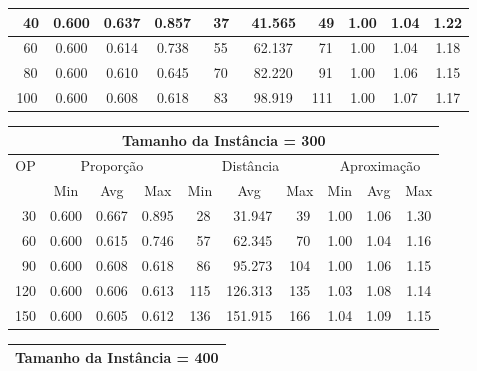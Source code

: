 \begin{table}[htbp]
\begin{center}
{\begin{tabular}{|c|c|c|c|c|c|c|c|c|c|}
~40                 & 0.600     & 0.637    & 0.857    & ~37      & ~41.565  & ~49     & 1.00    & 1.04   & 1.22            \\ \hline
~60                 & 0.600     & 0.614    & 0.738    & ~55      & ~62.137  & ~71     & 1.00    & 1.04   & 1.18            \\ \hline
~80                 & 0.600     & 0.610    & 0.645    & ~70      & ~82.220  & ~91     & 1.00    & 1.06   & 1.15            \\ \hline
100                 & 0.600     & 0.608    & 0.618    & ~83      & ~98.919  & 111     & 1.00    & 1.07   & 1.17            \\ \hline
\end{tabular}%
\vspace{5pt}
\begin{tabular}{|c|c|c|c|c|c|c|c|c|c|}
\hline
\multicolumn{10}{|c|}{\bf Tamanho da Instância = 300}                                                                          \\ \hline
\multirow{2}{*}{OP} & \multicolumn{3}{c|}{Proporção} & \multicolumn{3}{c|}{Distância} & \multicolumn{3}{c|}{Aproximação}   \\ \cline{2-10}
                    & Min       & Avg      & Max      & Min      & Avg      & Max     & Min     & Avg    & Max             \\ \hline
~30                 & 0.600     & 0.667    & 0.895    & ~28      & ~31.947  & ~39     & 1.00    & 1.06   & 1.30            \\ \hline
~60                 & 0.600     & 0.615    & 0.746    & ~57      & ~62.345  & ~70     & 1.00    & 1.04   & 1.16            \\ \hline
~90                 & 0.600     & 0.608    & 0.618    & ~86      & ~95.273  & 104     & 1.00    & 1.06   & 1.15            \\ \hline
120                 & 0.600     & 0.606    & 0.613    & 115      & 126.313  & 135     & 1.03    & 1.08   & 1.14            \\ \hline
150                 & 0.600     & 0.605    & 0.612    & 136      & 151.915  & 166     & 1.04    & 1.09   & 1.15            \\ \hline
\end{tabular}%
\vspace{5pt}
\begin{tabular}{|c|c|c|c|c|c|c|c|c|c|}
\hline
\multicolumn{10}{|c|}{\bf Tamanho da Instância = 400}                                                                          \\ \hline

\end{tabular}}
\end{center}
\end{table}
